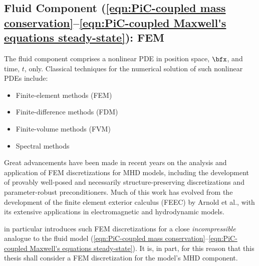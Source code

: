 \subsection*{Fluid Component (\ref{eqn:PiC-coupled mass conservation}--\ref{eqn:PiC-coupled Maxwell's equations steady-state}): FEM}
    The fluid component comprises a nonlinear PDE in position space, $\bfx$, and time, $t$, only. Classical techniques for the numerical solution of such nonlinear PDEs include:
    \begin{itemize}
        \item  Finite-element methods (FEM)
        \item  Finite-difference methods (FDM)
        \item  Finite-volume methods (FVM)
        \item  Spectral methods
    \end{itemize}
    Great advancements have been made in recent years on the analysis and application of FEM discretizations for MHD models, including the development of provably well-posed and necessarily structure-preserving discretizations and parameter-robust preconditioners. \cite{Hu_Xu_2015, Hu_Ma_Xu_2017, Hu_Lee_Xu_2021, Green_et_al_2022, Laakmann_Farrell_Mitchell_22, Laakmann_Hu_Farrell_2022} Much of this work has evolved from the development of the finite element exterior calculus (FEEC) by Arnold et al., with its extensive applications in electromagnetic and hydrodynamic models. \cite{Arnold_Falk_Winther_2006, Arnold_Falk_Winther_2009, Arnold_2018}
    
    \cite{Laakmann_Hu_Farrell_2022} in particular introduces such FEM discretizations for a close \emph{incompressible} analogue to the fluid model (\ref{eqn:PiC-coupled mass conservation}--\ref{eqn:PiC-coupled Maxwell's equations steady-state}). It is, in part, for this reason that this thesis shall consider a FEM discretization for the model's MHD component.
    